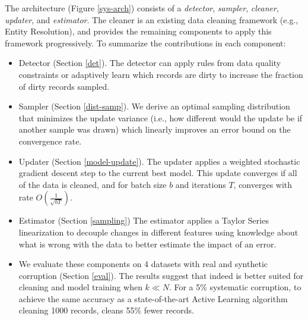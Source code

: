 The \sys architecture (Figure \ref{sys-arch}) consists of a \emph{detector}, \emph{sampler}, \emph{cleaner}, \emph{updater}, and \emph{estimator}.
The cleaner is an existing data cleaning framework (e.g., Entity Resolution), and \sys provides the remaining components to apply this framework progressively.
To summarize the contributions in each component:
\begin{itemize}[noitemsep]
\item Detector (Section \ref{det}). The detector can apply rules from data quality constraints or adaptively learn which records are dirty to increase the fraction of dirty records sampled.
\item Sampler (Section \ref{dist-samp}). We derive an optimal sampling distribution that minimizes the update variance (i.e., how different would the update be if another sample was drawn) which linearly improves an error bound on the convergence rate.
\item Updater (Section \ref{model-update}). The updater applies a weighted stochastic gradient descent step to the current best model. This update converges if all of the data is cleaned, and for batch size $b$ and iterations $T$, converges with rate $O(\frac{1}{\sqrt{bT}})$. 
\item Estimator (Section \ref{sampling}) The estimator applies a Taylor Series linearization to decouple changes in different features using knowledge about what is wrong with the data to better estimate the impact of an error.
\item We evaluate these components on 4 datasets with real and synthetic corruption (Section \ref{eval}). The results suggest that indeed \sys is better suited for cleaning and model training when $k\ll N$. For a 5\%  systematic corruption, to achieve the same accuracy as a state-of-the-art Active Learning algorithm cleaning 1000 records, \sys cleans 55\% fewer records.
\end{itemize}






